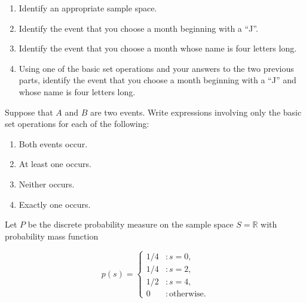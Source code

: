 \documentclass[12pt,reqno]{amsart}
\begin{document}
\medskip
\begin{enumerate}
\item Identify an appropriate sample space.\vfill
\item Identify the event that you choose a month beginning with a ``J''.\vfill
\item Identify the event that you choose a month whose name is four letters long.\vfill
\item Using one of the basic set operations and your answers to the two previous parts, identify the event that you choose a month beginning with a ``J'' and whose name is four letters long.\vfill
\end{enumerate}

























\prob Suppose that $A$ and $B$ are two events. Write expressions involving only the basic set operations for each of the following:

\bigskip
\begin{enumerate}
\item Both events occur.\vfill
\item At least one occurs.\vfill
\item Neither occurs.\vfill
\item Exactly one occurs.\vfill
\end{enumerate}














\newpage
\prob Let $P$ be the discrete probability measure on the sample space $S=\mathbb{R}$ with probability mass function

	\[
	p(s) = \begin{cases}
	1/4 & : s=0, \\
	1/4 & : s=2, \\
	1/2 & : s=4, \\
	0 & : \text{otherwise}.
	\end{cases}
	\]
\end{document}
